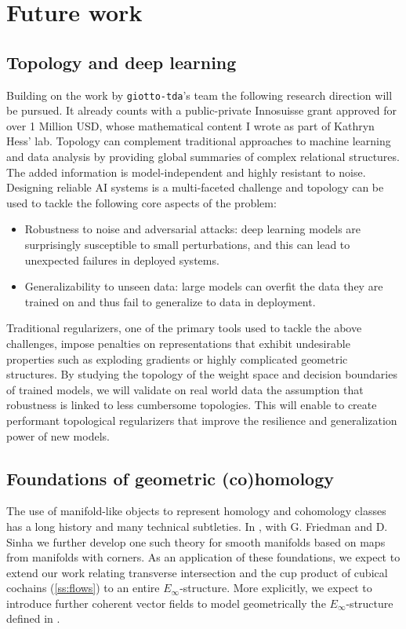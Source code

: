 
\section{Future work}

\subsection{Topology and deep learning}

Building on the work by \texttt{giotto-tda}'s team the following research direction will be pursued.
It already counts with a public-private Innosuisse grant approved for over 1 Million USD, whose mathematical content I wrote as part of Kathryn Hess' lab.
Topology can complement traditional approaches to machine learning and data analysis by providing global summaries of complex relational structures.
The added information is model-independent and highly resistant to noise.
Designing reliable AI systems is a multi-faceted challenge and topology can be used to tackle the following core aspects of the problem:
\begin{itemize}
	\item Robustness to noise and adversarial attacks: deep learning models are surprisingly susceptible to small perturbations, and this can lead to unexpected failures in deployed systems.
	\item Generalizability to unseen data: large models can overfit the data they are trained on and thus fail to generalize to data in deployment.
\end{itemize}
Traditional regularizers, one of the primary tools used to tackle the above challenges, impose penalties on representations that exhibit undesirable properties such as exploding gradients or highly complicated geometric structures.
By studying the topology of the weight space and decision boundaries of trained models, we will validate on real world data the assumption that robustness is linked to less cumbersome topologies.
This will enable to create performant topological regularizers that improve the resilience and generalization power of new models.

\subsection{Foundations of geometric (co)homology} \label{ss:foundations}

The use of manifold-like objects to represent homology and cohomology classes has a long history and many technical subtleties.
In \cite{medina2021foundations}, with G. Friedman and D. Sinha we further develop one such theory for smooth manifolds based on maps from manifolds with corners.
As an application of these foundations, we expect to extend our work relating transverse intersection and the cup product of cubical cochains (\cref{ss:flows}) to an entire $E_\infty$-structure.
More explicitly, we expect to introduce further coherent vector fields to model geometrically the $E_\infty$-structure defined in \cite{medina2021cubical}.

